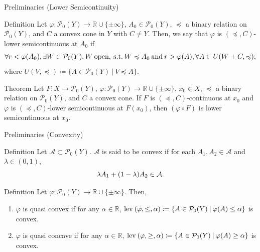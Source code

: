 \documentclass[aspectratio=169, dvipdfmx, 11pt]{beamer}
\newcommand{\RealNumberSet}{\mathbb{R}}
\newcommand{\OrderingLevelSets}[3]{\text{\rm lev\:$({#1}, {#2}, {#3})$}} %
\newcommand{\pow}[1]{\mathcal{P}_{0}(#1)}
\newcommand{\SuchThat}{\:\text{s.t.}\:}
\newcommand{\SetForm}[2]{
  \{{#1}\:|\:{#2}\}
}
\begin{document}
\begin{frame}{Preliminaries (Lower Semicontinuity)}
  \begin{block}{Definition \cite{500001551932}}
    Let $\varphi \colon \pow{Y} \to \RealNumberSet \cup \{\pm \infty\}$, $A_0 \in \pow{Y}$,
    $\preccurlyeq$ a binary relation on $\pow{Y}$, and $C$ a convex cone in $Y$ with $C \ne Y$. Then,
    we say that $\varphi$ is $(\preccurlyeq, C)$-lower semicontinuous at $A_0$ if
    \begin{equation}
      \forall r < \varphi (A_0), \exists W \in \pow{Y}, W\:\text{open}, \SuchThat W \preccurlyeq A_0 \:\text{and}\:
      r > \varphi (A), \forall A \in U(W + C, \preccurlyeq); \notag
    \end{equation}
    where $U(V,\preccurlyeq) \coloneqq \SetForm{A \in \pow{Y}}{V \preccurlyeq A}$.
  \end{block}

  \begin{block}{Theorem \cite{500001551932}}
    Let $F \colon X \to \pow{Y}$, $\varphi \colon \pow{Y} \to \RealNumberSet \cup \{\pm \infty\}$, $x_0 \in X$,
    $\preccurlyeq$ a binary relation on $\pow{Y}$, and $C$ a convex cone. If $F$ is $(\preccurlyeq, C)$-continuous at $x_0$
    and $\varphi$ is $(\preccurlyeq, C)$-lower semicontinuous at $F(x_0)$, then $(\varphi \circ F)$ is lower semicontinuous at $x_0$.
  \end{block}
\end{frame}

\begin{frame}{Preliminaries (Convexity)}
  \begin{block}{Definition \cite{MR3458699}}
    Let $\mathcal{A} \subset \pow{Y}$. $\mathcal{A}$ is said to be convex if for each $A_1, A_2 \in \mathcal{A}$ and $\lambda \in (0,1)$,
    \begin{equation}
      \lambda A_1 + (1-\lambda) A_2 \in \mathcal{A}. \notag
    \end{equation}
  \end{block}

  \begin{block}{Definition \cite{MR3458699}}
    Let $\varphi \colon \pow{Y} \to \RealNumberSet \cup \{\pm \infty\}$. Then,
    \begin{enumerate}
      \item $\varphi$ is quasi convex if for any $\alpha \in \RealNumberSet$,
            $\OrderingLevelSets{\varphi}{\leq}{\alpha} \coloneqq \SetForm{A \in \pow{Y}}{\varphi(A) \leq \alpha}$ is convex.
      \item $\varphi$ is quasi concave if for any $\alpha \in \RealNumberSet$,
            $\OrderingLevelSets{\varphi}{\geq}{\alpha} \coloneqq \SetForm{A \in \pow{Y}}{\varphi(A) \geq \alpha}$ is convex.
    \end{enumerate}
  \end{block}
\end{frame}
\end{document}
